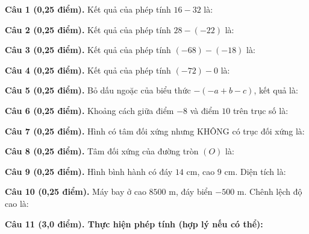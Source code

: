 \documentclass[12pt,a4paper]{article}
\begin{document}
\vspace{1.0mm}
\noindent\textbf{Câu 1 (0,25 điểm).} Kết quả của phép tính $16 - 32$ là: \par\vspace{0.25mm}
\noindent\textbf{Câu 2 (0,25 điểm).} Kết quả của phép tính $28 - (-22)$ là: \par\vspace{0.25mm}
\noindent\textbf{Câu 3 (0,25 điểm).} Kết quả của phép tính $(-68) - (-18)$ là: \par\vspace{0.25mm}
\noindent\textbf{Câu 4 (0,25 điểm).} Kết quả của phép tính $(-72) - 0$ là: \par\vspace{0.25mm}
\noindent\textbf{Câu 5 (0,25 điểm).} Bỏ dấu ngoặc của biểu thức $-(-a + b - c)$, kết quả là: \par\vspace{0.25mm}
\noindent\textbf{Câu 6 (0,25 điểm).} Khoảng cách giữa điểm $-8$ và điểm $10$ trên trục số là: \par\vspace{0.25mm}
\noindent\textbf{Câu 7 (0,25 điểm).} Hình có tâm đối xứng nhưng KHÔNG có trục đối xứng là: \par\vspace{0.25mm}
\noindent\textbf{Câu 8 (0,25 điểm).} Tâm đối xứng của đường tròn $(O)$ là: \par\vspace{0.25mm}
\noindent\textbf{Câu 9 (0,25 điểm).} Hình bình hành có đáy $14\text{ cm}$, cao $9\text{ cm}$. Diện tích là: \par\vspace{0.25mm}
\noindent\textbf{Câu 10 (0,25 điểm).} Máy bay ở cao $8500\text{ m}$, đáy biển $-500\text{ m}$. Chênh lệch độ cao là: \par\vspace{0.25mm}

\vspace{0.3mm}
\noindent\textbf{Câu 11 (3,0 điểm). Thực hiện phép tính (hợp lý nếu có thể):}
\vspace{0.4mm}
\end{document}
